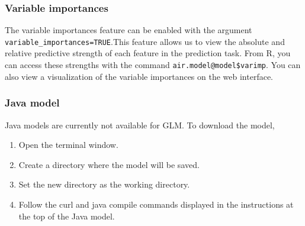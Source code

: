 \documentclass[11pt]{article}
\begin{document}
\subsubsection{Variable importances} \label{3.3.1}
The variable importances feature can be enabled with the argument \texttt{variable\_importances=TRUE}.This feature allows us to view the absolute and relative predictive strength of each feature in the prediction task. From R, you can access these strengths with the command \texttt{air.model@model\$varimp}. You can also view a visualization of the variable
importances on the web interface.

\subsubsection{Java model} %
Java models are currently not available for GLM.
To download the model, 
\begin{enumerate}
\item Open the terminal window. 
\item Create a directory where the model will be saved.
\item Set the new directory as the working directory.
\item Follow the curl and java compile commands displayed in the instructions at the top of the Java model.
\end{enumerate}
\newpage

\end{document}
